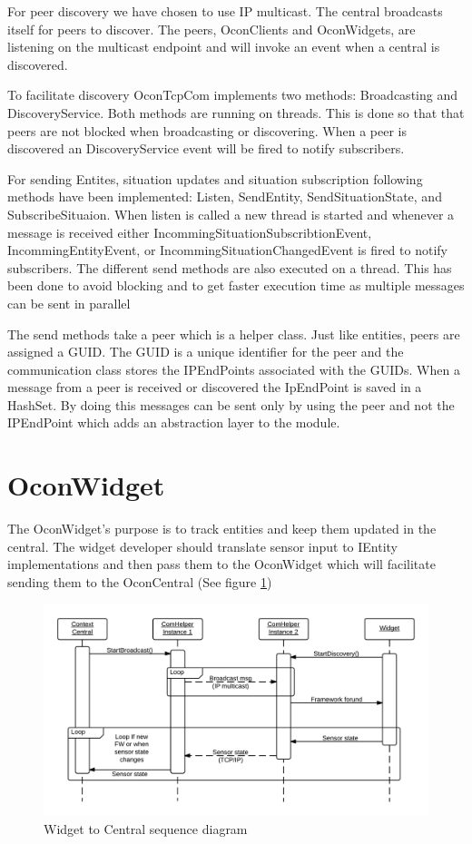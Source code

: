 \documentclass[../report.tex]{subfiles}
\begin{document}
For peer discovery we have chosen to use IP multicast. The central broadcasts itself for peers to discover. The peers, OconClients and OconWidgets, are listening on the multicast endpoint and will invoke an event when a central is discovered.

To facilitate discovery OconTcpCom implements two methods: Broadcasting and DiscoveryService. Both methods are running on threads. This is done so that that peers are not blocked when broadcasting or discovering. When a peer is discovered an DiscoveryService event will be fired to notify subscribers.

For sending Entites, situation updates and situation subscription following methods have been implemented: Listen, SendEntity, SendSituationState, and SubscribeSituaion. When listen is called a new thread is started and whenever a message is received either IncommingSituationSubscribtionEvent, IncommingEntityEvent, or IncommingSituationChangedEvent is fired to notify subscribers. The different send methods are also executed on a thread. This has been done to avoid blocking and to get faster execution time as multiple messages can be sent in parallel

The send methods take a peer which is a helper class. Just like entities, peers are assigned a GUID. The GUID is a unique identifier for the peer and the communication class stores the IPEndPoints associated with the GUIDs. When a message from a peer is received or discovered the IpEndPoint is saved in a HashSet. By doing this messages can be sent only by using the peer and not the IPEndPoint which adds an abstraction layer to the module. 

\section{OconWidget}
\label{sec:OconWidget}

The OconWidget's purpose is to track entities and keep them updated in the central. The widget developer should translate sensor input to IEntity implementations and then pass them to the OconWidget which will facilitate sending them to the OconCentral (See figure \ref{fig:widgetComHelper})

\begin{figure}
\hspace{-70px}
\includegraphics[width=500px]{comHelperSequence-widget.png}
\caption{Widget to Central sequence diagram}
\label{fig:widgetComHelper}
\end{figure}
\end{document}
